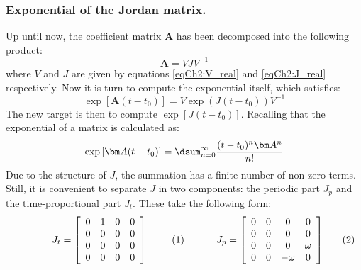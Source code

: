 		\subsubsection{Exponential of the Jordan matrix.}
		\indent Up until now, the coefficient matrix $\bm A$ has been decomposed into the following product:
		\[
		\bm A = V J V^{-1}
		\]
		\noindent where $V$ and $J$ are given by equations \eqref{eqCh2:V_real} and \eqref{eqCh2:J_real} respectively. Now it is turn to compute the exponential itself, which satisfies:
		\begin{equation}
		\exp\left[\bm A (t - t_0) \right] = V \exp\left(J(t - t_0)\right) V^{-1}
		\label{eqCh2:expAt}
		\end{equation}
		\indent The new target is then to compute $\exp\left[J(t - t_0)\right]$. Recalling that the exponential of a matrix is calculated as:
		\[
		\exp\left[\bm A(t - t_0)\right]= \dsum_{n = 0}^{\infty} \dfrac{(t - t_0)^n \bm A^n}{n!}
		\]
		\indent Due to the structure of $J$, the summation has a finite number of non-zero terms. Still, it is convenient to separate $J$ in two components: the periodic part $J_p$ and the time-proportional part $J_t$. These take the following form:\\
		\vspace{1em}
		\begin{subequations}
		\begin{minipage}{.5\linewidth}
		\begin{equation}
		J_t = \left[ \begin{array}{cccc}
			0 	& 1	& 0		& 0			\\
			0 	& 0	& 0  	& 0 		\\
			0 	& 0	& 0		& 0	\\
			0 	& 0	& 0 	& 0
			\end{array}\right]
			\label{eqCh2:Jt}
		\end{equation}
		\end{minipage}
		\begin{minipage}{.5\linewidth}
		\begin{equation}
		J_p = \left[ \begin{array}{cccc}
			0 	& 0	& 0		& 0			\\
			0 	& 0	& 0  	& 0 		\\
			0 	& 0	& 0		& \omega	\\
			0 	& 0	& -\omega 	& 0
			\end{array}\right]
			\label{eqCh2:Jp}
		\end{equation}
		\end{minipage}
		\end{subequations}		
